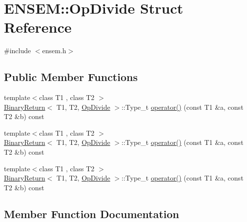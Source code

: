 \hypertarget{structENSEM_1_1OpDivide}{}\section{E\+N\+S\+EM\+:\+:Op\+Divide Struct Reference}
\label{structENSEM_1_1OpDivide}


{\ttfamily \#include $<$ensem.\+h$>$}

\subsection*{Public Member Functions}
\begin{DoxyCompactItemize}
\item 
{\footnotesize template$<$class T1 , class T2 $>$ }\\\mbox{\hyperlink{structENSEM_1_1BinaryReturn}{Binary\+Return}}$<$ T1, T2, \mbox{\hyperlink{structENSEM_1_1OpDivide}{Op\+Divide}} $>$\+::Type\+\_\+t \mbox{\hyperlink{structENSEM_1_1OpDivide_a20d785467177a704a754587d984736c3}{operator()}} (const T1 \&a, const T2 \&b) const
\item 
{\footnotesize template$<$class T1 , class T2 $>$ }\\\mbox{\hyperlink{structENSEM_1_1BinaryReturn}{Binary\+Return}}$<$ T1, T2, \mbox{\hyperlink{structENSEM_1_1OpDivide}{Op\+Divide}} $>$\+::Type\+\_\+t \mbox{\hyperlink{structENSEM_1_1OpDivide_a20d785467177a704a754587d984736c3}{operator()}} (const T1 \&a, const T2 \&b) const
\item 
{\footnotesize template$<$class T1 , class T2 $>$ }\\\mbox{\hyperlink{structENSEM_1_1BinaryReturn}{Binary\+Return}}$<$ T1, T2, \mbox{\hyperlink{structENSEM_1_1OpDivide}{Op\+Divide}} $>$\+::Type\+\_\+t \mbox{\hyperlink{structENSEM_1_1OpDivide_a20d785467177a704a754587d984736c3}{operator()}} (const T1 \&a, const T2 \&b) const
\end{DoxyCompactItemize}


\subsection{Member Function Documentation}
\mbox{\label{structENSEM_1_1OpDivide_a20d785467177a704a754587d984736c3}} 
